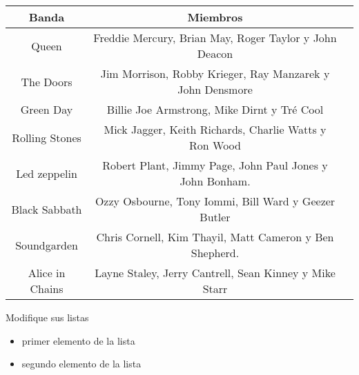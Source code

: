 \documentclass[12pt]{article}
\begin{document}
\begin{center}
    \begin{tabular}{|c|c|c|}
    \hline
         \textbf{Banda} & \textbf{Miembros} \\
        \hline
         Queen & Freddie Mercury, Brian May, Roger Taylor y John Deacon  \\
         \hline
         The Doors & Jim Morrison, Robby Krieger, Ray Manzarek y John Densmore \\
         \hline
         Green Day & Billie Joe Armstrong, Mike Dirnt  y Tré Cool  \\
         \hline
         Rolling Stones & Mick Jagger, Keith Richards, Charlie Watts y Ron Wood  \\
         \hline
         Led zeppelin & Robert Plant, Jimmy Page,  John Paul Jones y John Bonham.  \\
         \hline
         Black Sabbath & Ozzy Osbourne, Tony Iommi, Bill Ward y Geezer Butler \\
         \hline
         Soundgarden & Chris Cornell, Kim Thayil, Matt Cameron y Ben Shepherd. \\
         \hline
         Alice in Chains &  Layne Staley, Jerry Cantrell, Sean Kinney y Mike Starr \\
         \hline
         
    \end{tabular}
\end{center}

Modifique sus listas

\begin{itemize}
\item primer elemento de la lista
\item segundo elemento de la lista
\end{itemize}
\end{document}
